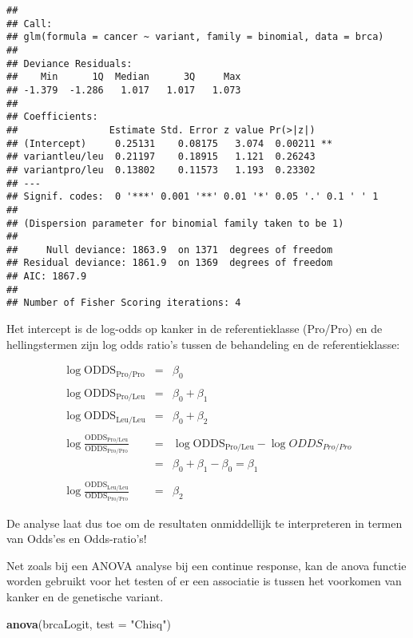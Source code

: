 \documentclass[
  12pt,dutch,coursenotes]{book}
\newenvironment{Shaded}{\begin{snugshade}}{\end{snugshade}}
\newcommand{\DataTypeTok}[1]{\textcolor[rgb]{0.13,0.29,0.53}{#1}}
\newcommand{\KeywordTok}[1]{\textcolor[rgb]{0.13,0.29,0.53}{\textbf{#1}}}
\newcommand{\NormalTok}[1]{#1}
\newcommand{\StringTok}[1]{\textcolor[rgb]{0.31,0.60,0.02}{#1}}
\theoremstyle{definition}
\theoremstyle{definition}
\theoremstyle{definition}
\theoremstyle{remark}
\begin{document}
\begin{verbatim}
## 
## Call:
## glm(formula = cancer ~ variant, family = binomial, data = brca)
## 
## Deviance Residuals: 
##    Min      1Q  Median      3Q     Max  
## -1.379  -1.286   1.017   1.017   1.073  
## 
## Coefficients:
##                Estimate Std. Error z value Pr(>|z|)   
## (Intercept)     0.25131    0.08175   3.074  0.00211 **
## variantleu/leu  0.21197    0.18915   1.121  0.26243   
## variantpro/leu  0.13802    0.11573   1.193  0.23302   
## ---
## Signif. codes:  0 '***' 0.001 '**' 0.01 '*' 0.05 '.' 0.1 ' ' 1
## 
## (Dispersion parameter for binomial family taken to be 1)
## 
##     Null deviance: 1863.9  on 1371  degrees of freedom
## Residual deviance: 1861.9  on 1369  degrees of freedom
## AIC: 1867.9
## 
## Number of Fisher Scoring iterations: 4
\end{verbatim}

Het intercept is de log-odds op kanker in de referentieklasse (Pro/Pro) en de hellingstermen zijn log odds ratio's tussen de behandeling en de referentieklasse:

\begin{eqnarray*}
\log \text{ODDS}_\text{Pro/Pro}&=&\beta_0\\\\
\log \text{ODDS}_\text{Pro/Leu}&=&\beta_0+\beta_1\\\\
\log \text{ODDS}_\text{Leu/Leu}&=&\beta_0+\beta_2\\\\
\log  \frac{\text{ODDS}_\text{Pro/Leu}}{\text{ODDS}_\text{Pro/Pro}}&=&\log \text{ODDS}_\text{Pro/Leu}-\log ODDS_{Pro/Pro}\\
&=&\beta_0+\beta_1-\beta_0=\beta_1\\\\
\log  \frac{\text{ODDS}_\text{Leu/Leu}}{\text{ODDS}_\text{Pro/Pro}}&=&\beta_2
\end{eqnarray*}

De analyse laat dus toe om de resultaten onmiddellijk te interpreteren in termen van Odds'es en Odds-ratio's!

Net zoals bij een ANOVA analyse bij een continue response, kan de anova functie worden gebruikt voor het testen of er een associatie is tussen het voorkomen van kanker en de genetische variant.

\begin{Shaded}
\begin{Highlighting}[]
\KeywordTok{anova}\NormalTok{(brcaLogit, }\DataTypeTok{test =} \StringTok{"Chisq"}\NormalTok{)}
\end{Highlighting}
\end{Shaded}
\end{document}
